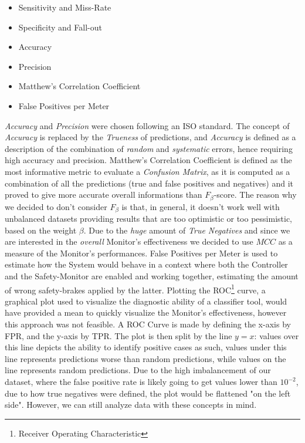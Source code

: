 \begin{itemize}
	\item Sensitivity and Miss-Rate
	\item Specificity and Fall-out
	\item Accuracy
	\item Precision
	\item Matthew's Correlation Coefficient
	\item False Positives per Meter
\end{itemize}

\textsl{Accuracy} and \textsl{Precision} were chosen following an ISO standard. The concept of \textsl{Accuracy} is replaced by the \textsl{Trueness} of predictions, and \textsl{Accuracy} is defined as a description of the combination of \textsl{random} and \textsl{systematic} errors, hence requiring high accuracy and precision. \cite{isoacc}
Matthew's Correlation Coefficient is defined as the most informative metric to evaluate a \textsl{Confusion Matrix}, as it is computed as a combination of all the predictions (true and false positives and negatives) and it proved to give more accurate overall informations than $F_{\beta}$-score. The reason why we decided to don't consider $F_{\beta}$ is that, in general, it doesn't work well with unbalanced datasets providing results that are too optimistic or too pessimistic, based on the weight $\beta$. Due to the \textsl{huge} amount of \textsl{True Negatives} and since we are interested in the \textsl{overall} Monitor's effectiveness we decided to use $MCC$ as a measure of the Monitor's performances. \cite{mcc}
False Positives per Meter is used to estimate how the System would behave in a context where both the Controller and the Safety-Monitor are enabled and working together, estimating the amount of wrong safety-brakes applied by the latter.
Plotting the ROC\footnote{Receiver Operating Characteristic} curve, a graphical plot used to visualize the diagnostic ability of a classifier tool, would have provided a mean to quickly visualize the Monitor's effectiveness, however this approach was not feasible. A ROC Curve is made by defining the x-axis by FPR, and the y-axis by TPR. The plot is then split by the line $y=x$: values over this line depicts the ability to identify positive cases as such, values under this line represents predictions worse than random predictions, while values on the line represents random predictions. Due to the high imbalancement of our dataset, where the false positive rate is likely going to get values lower than $10^{-2}$, due to how true negatives were defined, the plot would be flattened "on the left side". However, we can still analyze data with these concepts in mind.

